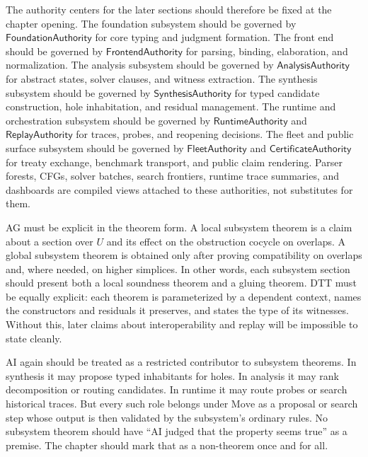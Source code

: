 \documentclass[11pt]{report}
\begin{document}
The authority centers for the later sections should therefore be fixed at the chapter opening. The foundation subsystem should be governed by $\mathsf{FoundationAuthority}$ for core typing and judgment formation. The front end should be governed by $\mathsf{FrontendAuthority}$ for parsing, binding, elaboration, and normalization. The analysis subsystem should be governed by $\mathsf{AnalysisAuthority}$ for abstract states, solver clauses, and witness extraction. The synthesis subsystem should be governed by $\mathsf{SynthesisAuthority}$ for typed candidate construction, hole inhabitation, and residual management. The runtime and orchestration subsystem should be governed by $\mathsf{RuntimeAuthority}$ and $\mathsf{ReplayAuthority}$ for traces, probes, and reopening decisions. The fleet and public surface subsystem should be governed by $\mathsf{FleetAuthority}$ and $\mathsf{CertificateAuthority}$ for treaty exchange, benchmark transport, and public claim rendering. Parser forests, CFGs, solver batches, search frontiers, runtime trace summaries, and dashboards are compiled views attached to these authorities, not substitutes for them.

AG must be explicit in the theorem form. A local subsystem theorem is a claim about a section over $U$ and its effect on the obstruction cocycle on overlaps. A global subsystem theorem is obtained only after proving compatibility on overlaps and, where needed, on higher simplices. In other words, each subsystem section should present both a local soundness theorem and a gluing theorem. DTT must be equally explicit: each theorem is parameterized by a dependent context, names the constructors and residuals it preserves, and states the type of its witnesses. Without this, later claims about interoperability and replay will be impossible to state cleanly.

AI again should be treated as a restricted contributor to subsystem theorems. In synthesis it may propose typed inhabitants for holes. In analysis it may rank decomposition or routing candidates. In runtime it may route probes or search historical traces. But every such role belongs under $\mathrm{Move}$ as a proposal or search step whose output is then validated by the subsystem's ordinary rules. No subsystem theorem should have ``AI judged that the property seems true'' as a premise. The chapter should mark that as a non-theorem once and for all.
\end{document}
